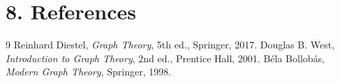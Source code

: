 \section*{8. References}

\begin{thebibliography}{9}
 Reinhard Diestel, \emph{Graph Theory}, 5th ed., Springer, 2017.
 Douglas B. West, \emph{Introduction to Graph Theory}, 2nd ed., Prentice Hall, 2001.
 Béla Bollobás, \emph{Modern Graph Theory}, Springer, 1998.
\end{thebibliography}
